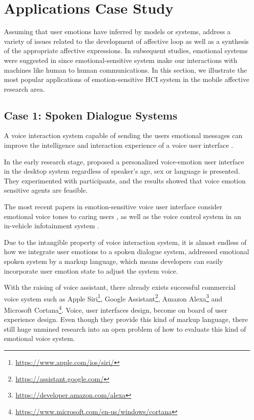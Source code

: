 \section{Applications Case Study}\label{sec:applications}

Assuming that user emotions have inferred by models or systems, \cite{Conati2005} address a variety of issues related to the development of affective loop as well as a synthesis of the appropriate affective expressions. In subsequent studies, emotional systems were suggested in \cite{Crane2007} since emotional-sensitive system make our interactions with machines like human to human communications\cite{picard1999affective}. In this section, we illustrate the most popular applications of emotion-sensitive HCI system in the mobile affective research area.

\subsection{Case 1: Spoken Dialogue Systems}

A voice interaction system capable of sending the users emotional messages can improve the intelligence and interaction experience of a voice user interface \cite{surace2001voice}.

In the early research stage, \cite{kostov2000emotion} proposed a personalized voice-emotion user interface in the desktop system regardless of speaker's age, sex or language is presented. They experimented with participants, and the results showed that voice emotion sensitive agents are feasible.

The most recent papers in emotion-sensitive voice user interface consider emotional voice tones to caring users \cite{chang2016intelligent}, as well as the voice control system in an in-vehicle infotainment system \cite{kim2016effects}.

Due to the intangible property of voice interaction system, it is almost endless of how we integrate user emotions to a spoken dialogue system, \cite{mctear2016rise} addressed emotional spoken system by a markup language, which means developers can easily incorporate user emotion state to adjust the system voice. 

With the raising of voice assistant, there already exists successful commercial voice system such as Apple Siri\footnote{\url{https://www.apple.com/ios/siri/}}, Google Assistant\footnote{\url{https://assistant.google.com/}}, Amazon Alexa\footnote{\url{https://developer.amazon.com/alexa}} and Microsoft Cortana\footnote{\url{https://www.microsoft.com/en-us/windows/cortana}}. Voice, user interfaces design, become on board of user experience design. Even though they provide this kind of markup language, there still huge unmined research into an open problem of how to evaluate this kind of emotional voice system.

